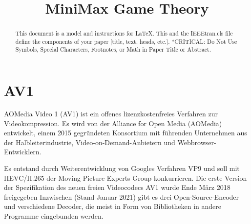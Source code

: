 \documentclass[conference]{IEEEtran}
\begin{document}
\title{MiniMax Game Theory}

\author{
    \and
    \and
}

\maketitle

\begin{abstract}
    This document is a model and instructions for \LaTeX.
    This and the IEEEtran.cls file define the components of your paper [title, text, heads, etc.]. *CRITICAL: Do Not Use Symbols, Special Characters, Footnotes,
    or Math in Paper Title or Abstract.
\end{abstract}

\section{AV1}
AOMedia Video 1 (AV1) ist ein offenes lizenzkostenfreies Verfahren zur Videokompression. Es wird von der Alliance for Open Media (AOMedia) entwickelt, einem 2015 gegründeten Konsortium mit führenden Unternehmen aus der Halbleiterindustrie, Video-on-Demand-Anbietern und Webbrowser-Entwicklern.

Es entstand durch Weiterentwicklung von Googles Verfahren VP9 und soll mit HEVC/H.265 der Moving Picture Experts Group konkurrieren. Die erste Version der Spezifikation des neuen freien Videocodecs AV1 wurde Ende März 2018 freigegeben Inzwischen (Stand Januar 2021) gibt es drei Open-Source-Encoder und verschiedene Decoder, die meist in Form von Bibliotheken in andere Programme eingebunden werden.
\end{document}
